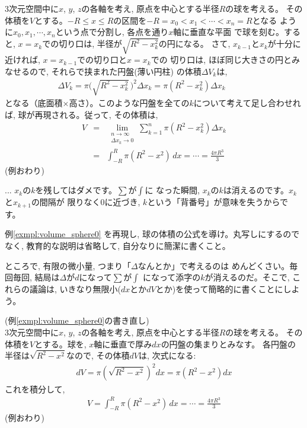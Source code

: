 \begin{exmpl}\label{exmpl:volume_sphere0}
3次元空間中に$x$, $y$, $z$の各軸を考え, 原点を中心とする半径$R$の球を考える。
その体積を$V$とする。$-R\leq x \leq R$の区間を$-R=x_0<x_1<\cdots<x_n=R$となる
ように$x_0, x_1, \cdots, x_n$という点で分割し, 各点を通り$x$軸に垂直な平面
で球を刻む。すると, $x=x_k$での切り口は, 半径が$\sqrt{R^2-x_k^2}$の円になる。
さて, $x_{k-1}$と$x_k$が十分に近ければ, $x=x_{k-1}$での切り口と$x=x_{k}$での
切り口は, ほぼ同じ大きさの円とみなせるので, それらで挟まれた円盤(薄い円柱)
の体積$\Delta V_k$は, 
\begin{eqnarray}
\Delta V_k=\pi\bigl(\sqrt{R^2-x_k^2}\,\bigr)^2\Delta x_k=\pi(R^2-x_k^2)\Delta x_k\quad\quad\quad
\label{eq:volume_sphere02}
\end{eqnarray}
となる（底面積×高さ）。このような円盤を全ての$k$について考えて足し合わせれば, 
球が再現される。従って, その体積は, 
\begin{eqnarray}
V&=&\lim_{\substack{n\rightarrow \infty\\\Delta x_k\rightarrow 0}}\sum^{n}_{k=1}\pi(R^2-x_k^2)\Delta x_k\label{eq:volume_sphere04}\\
 &=&\int_{-R}^{R}\pi(R^2-x^2)\,dx=\cdots=\frac{4\pi R^3}{3}\label{eq:volume_sphere06}
\end{eqnarray}
(例おわり)
\end{exmpl}


\begin{freqmiss}{\small{} ... $x_k$の$k$を残してはダメです。$\sum$が$\int$に
なった瞬間, $x_k$の$k$は消えるのです。$x_k$と$x_{k+1}$の間隔が
限りなく0に近づき, $k$という「背番号」が意味を失うからです。}\end{freqmiss}

\begin{q}\label{q:int_ball2} 例\ref{exmpl:volume_sphere0}
を再現し, 球の体積の公式を導け。丸写しにするのでなく, 
教育的な説明は省略して, 自分なりに簡潔に書くこと。\end{q}\mv

ところで, 有限の微小量, つまり「$\Delta$なんとか」で考えるのは
めんどくさい。毎回毎回, 結局は$\Delta$が$d$になって$\sum$が$\int$
になって添字の$k$が消えるのだ。そこで, これらの議論は, 
いきなり無限小($dx$とか$dV$とか)を使って簡略的に書くことにしよう。
\begin{exmpl} (例\ref{exmpl:volume_sphere0}の書き直し)\\
3次元空間中に$x$, $y$, $z$の各軸を考え, 原点を中心とする半径$R$の球を考える。
その体積を$V$とする。球を, $x$軸に垂直で厚み$dx$の円盤の集まりとみなす。
各円盤の半径は$\sqrt{R^2-x^2}$なので, その体積$dV$は, 次式になる:
\begin{eqnarray}
dV=\pi(\sqrt{R^2-x^2})^2dx=\pi(R^2-x^2)dx\label{eq:volume_sphere02d}
\end{eqnarray}
これを積分して, 
\begin{eqnarray}
V=\int_{-R}^{R}\pi(R^2-x^2)\,dx=\cdots=\frac{4\pi R^3}{3}\label{eq:volume_sphere06d}
\end{eqnarray}
(例おわり)
\end{exmpl}

